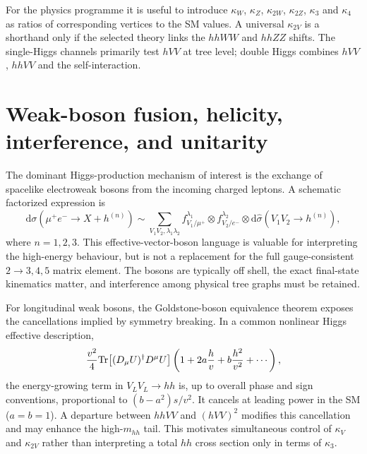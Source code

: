 \documentclass[12pt,a4paper]{article}
\newcommand{\newnote}{\clearpage}
\begin{document}
For the physics programme it is useful to introduce $\kappa_W$, $\kappa_Z$, $\kappa_{2W}$, $\kappa_{2Z}$, $\kappa_3$ and $\kappa_4$ as ratios of corresponding vertices to the SM values. A universal $\kappa_{2V}$ is a shorthand only if the selected theory links the $hhWW$ and $hhZZ$ shifts. The single-Higgs channels primarily test $hVV$ at tree level; double Higgs combines $hVV$, $hhVV$ and the self-interaction.




\newnote

\section{Weak-boson fusion, helicity, interference, and unitarity}
The dominant Higgs-production mechanism of interest is the exchange of spacelike electroweak bosons from the incoming charged leptons. A schematic factorized expression is
\begin{equation}
\mathrm d\sigma(\mu^+e^-\to X+h^{(n)})\sim
\sum_{V_1V_2,\lambda_1\lambda_2}
 f_{V_1/\mu^+}^{\lambda_1}\otimes f_{V_2/e^-}^{\lambda_2}
 \otimes\mathrm d\hat\sigma(V_1V_2\to h^{(n)}),
\end{equation}
where $n=1,2,3$. This effective-vector-boson language is valuable for interpreting the high-energy behaviour, but is not a replacement for the full gauge-consistent $2\to3,4,5$ matrix element. The bosons are typically off shell, the exact final-state kinematics matter, and interference among physical tree graphs must be retained.

For longitudinal weak bosons, the Goldstone-boson equivalence theorem exposes the cancellations implied by symmetry breaking. In a common nonlinear Higgs effective description,
\begin{equation}
\frac{v^2}{4}{\rm Tr}\!\left[(D_\mu U)^\dagger D^\mu U\right]
\left(1+2a\frac{h}{v}+b\frac{h^2}{v^2}+\cdots\right),
\end{equation}
the energy-growing term in $V_LV_L\to hh$ is, up to overall phase and sign conventions, proportional to $(b-a^2)s/v^2$. It cancels at leading power in the SM ($a=b=1$). A departure between $hhVV$ and $(hVV)^2$ modifies this cancellation and may enhance the high-$m_{hh}$ tail. This motivates simultaneous control of $\kappa_V$ and $\kappa_{2V}$ rather than interpreting a total $hh$ cross section only in terms of $\kappa_3$.
\end{document}
